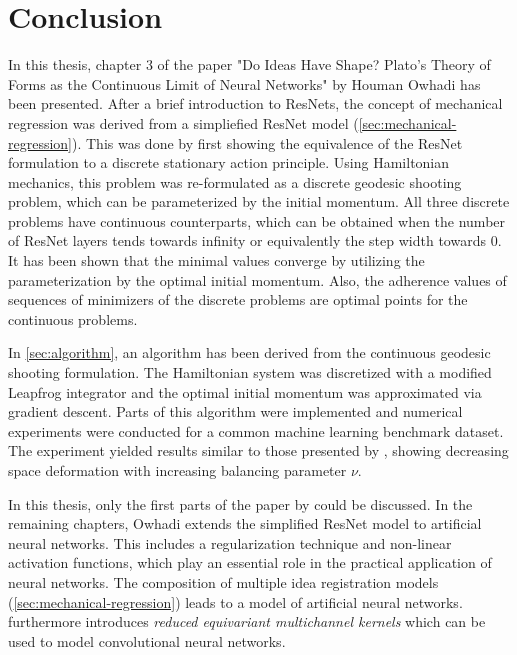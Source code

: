 \section{Conclusion}

In this thesis, chapter 3 of the paper "Do Ideas Have Shape? Plato's Theory of Forms as the Continuous Limit of Neural Networks" by Houman Owhadi has been presented.
After a brief introduction to ResNets, the concept of mechanical regression was derived from a simpliefied ResNet  model (\cref{sec:mechanical-regression}).
This was done by first showing the equivalence of the ResNet formulation to a discrete stationary action principle.
Using Hamiltonian mechanics, this problem was re-formulated as a discrete geodesic shooting problem, which can be parameterized by the initial momentum.
All three discrete problems have continuous counterparts, which can be obtained when the number of ResNet layers tends towards infinity or equivalently the step width towards $0$.
It has been shown that the minimal values converge by utilizing the parameterization by the optimal initial momentum.
Also, the adherence values of sequences of minimizers of the discrete problems are optimal points for the continuous problems.

In \cref{sec:algorithm}, an algorithm has been derived from the continuous geodesic shooting formulation.
The Hamiltonian system was discretized with a modified Leapfrog integrator and the optimal initial momentum was approximated via gradient descent.
Parts of this algorithm were implemented and numerical experiments were conducted for a common machine learning benchmark dataset.
The experiment yielded results similar to those presented by \cite{owhadi20}, showing decreasing space deformation with increasing balancing parameter $\nu$.

In this thesis, only the first parts of the paper by \citet{owhadi20} could be discussed.
In the remaining chapters, Owhadi extends the simplified ResNet model to artificial neural networks.
This includes a regularization technique and non-linear activation functions, which play an essential role in the practical application of neural networks.
The composition of multiple idea registration models (\cref{sec:mechanical-regression}) leads to a model of artificial neural networks.
\cite{owhadi20} furthermore introduces \emph{reduced equivariant multichannel kernels} which can be used to model convolutional neural networks.